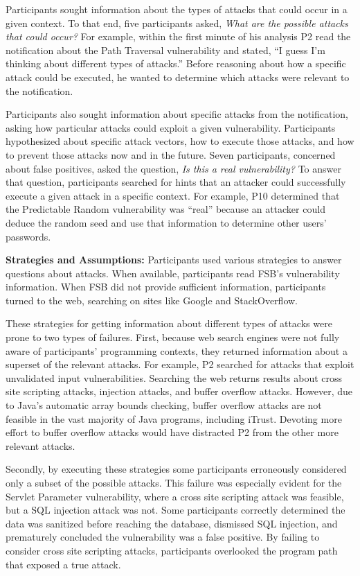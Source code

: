 \documentclass[10pt,journal,compsoc]{IEEEtran}
\begin{document}
Participants sought information about the types of attacks that could occur in a given context.
To that end, five participants asked, \textit{What are the possible attacks that could occur?}
For example, within the first minute of his analysis P2 read the notification about the Path Traversal vulnerability and stated, ``I guess I'm thinking about different types of attacks.''
Before reasoning about how a specific attack could be executed, he wanted to determine which attacks were relevant to the notification.

Participants also sought information about specific attacks from the notification, asking how particular attacks could exploit a given vulnerability.
Participants hypothesized about specific attack vectors, how to execute those attacks, and how to prevent those attacks now and in the future.
Seven participants, concerned about false positives, asked the question, \textit{Is this a real vulnerability?} 
To answer that question, participants searched for hints that an attacker could successfully execute a given attack in a specific context. 
For example, P10 determined that the Predictable Random vulnerability was ``real'' because an attacker could deduce the random seed and use that information to determine other users' passwords. 

\textbf{Strategies and Assumptions:}
Participants used various strategies to answer questions about attacks.
When available, participants read FSB's vulnerability information. 
When FSB did not provide sufficient information, participants turned to the web, searching on sites like Google and StackOverflow. 

These strategies for getting information about different types of attacks were prone to two types of failures. 
First, because web search engines were not fully aware of participants' programming contexts, they returned information about a superset of the relevant attacks.
For example, P2 searched for attacks that exploit unvalidated input vulnerabilities.
Searching the web returns results about cross site scripting attacks, injection attacks, and buffer overflow attacks. 
However, due to Java's automatic array bounds checking, buffer overflow attacks are not feasible in the vast majority of Java programs, including iTrust.
Devoting more effort to buffer overflow attacks would have distracted P2 from the other more relevant attacks. 


Secondly, by executing these strategies some participants erroneously considered only a subset of the possible attacks. 
This failure was especially evident for the Servlet Parameter vulnerability, where a cross site scripting attack was feasible, but a SQL injection attack was not. 
Some participants correctly determined the data was sanitized before reaching the database, dismissed SQL injection, and prematurely concluded the vulnerability was a false positive.
By failing to consider cross site scripting attacks, participants overlooked the program path that exposed a true attack.
\end{document}
